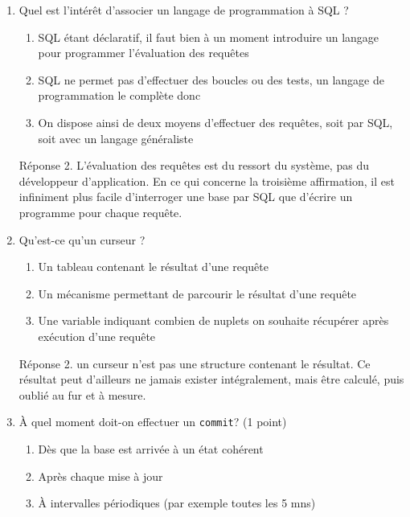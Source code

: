 \begin{enumerate}

  \item Quel est l’intérêt d’associer un langage de programmation à SQL ?

\begin{enumerate}
  \item  SQL étant déclaratif, il faut bien à un moment introduire un langage pour programmer l’évaluation des requêtes

  \item SQL ne permet pas d’effectuer des boucles ou des tests, un langage de programmation le complète donc
  \item On dispose ainsi de deux moyens d’effectuer des requêtes, soit par SQL, soit avec un langage généraliste
\end{enumerate}


\begin{solution}
Réponse 2. L’évaluation des requêtes est du ressort du système, 
pas du développeur d’application. En ce qui concerne la troisième affirmation, il est infiniment plus facile d’interroger une base par SQL que d’écrire un programme pour chaque requête.
\end{solution}

\item Qu’est-ce qu’un curseur ?

\begin{enumerate}
  \item  Un tableau contenant le résultat d’une requête
  \item Un mécanisme permettant de parcourir le résultat d’une requête
  \item Une variable indiquant combien de nuplets on souhaite récupérer après exécution d’une requête
\end{enumerate}

\begin{solution}
Réponse 2. un curseur n’est pas une structure contenant le résultat. Ce résultat peut d’ailleurs ne jamais exister intégralement, 
mais être calculé, puis oublié au fur et à mesure.
\end{solution}

\item À quel moment doit-on effectuer un \texttt{commit}? (1 point)

\begin{enumerate}
  \item  Dès que la base est arrivée à un état cohérent
  \item  Après chaque mise à jour
  \item  À intervalles périodiques (par exemple toutes les 5 mns)
\end{enumerate}



\end{enumerate}

